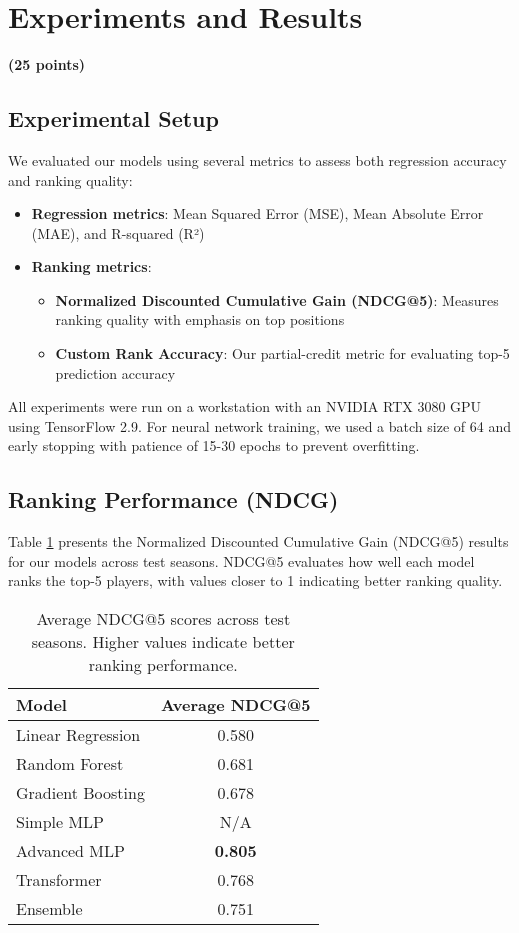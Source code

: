 \documentclass[10pt,twocolumn,letterpaper]{article}
\begin{document}
\section{Experiments and Results}
\textbf{(25 points)}

\subsection{Experimental Setup}

We evaluated our models using several metrics to assess both regression accuracy and ranking quality:

\begin{itemize}
    \item \textbf{Regression metrics}: Mean Squared Error (MSE), Mean Absolute Error (MAE), and R-squared (R²)
    \item \textbf{Ranking metrics}: 
    \begin{itemize}
        \item \textbf{Normalized Discounted Cumulative Gain (NDCG@5)}: Measures ranking quality with emphasis on top positions
        \item \textbf{Custom Rank Accuracy}: Our partial-credit metric for evaluating top-5 prediction accuracy
    \end{itemize}
\end{itemize}

All experiments were run on a workstation with an NVIDIA RTX 3080 GPU using TensorFlow 2.9. For neural network training, we used a batch size of 64 and early stopping with patience of 15-30 epochs to prevent overfitting.

\subsection{Ranking Performance (NDCG)}

Table \ref{tab:ndcg_results} presents the Normalized Discounted Cumulative Gain (NDCG@5) results for our models across test seasons. NDCG@5 evaluates how well each model ranks the top-5 players, with values closer to 1 indicating better ranking quality.

\begin{table}
\begin{center}
\begin{tabular}{|l|c|}
\hline
Model & Average NDCG@5 \\
\hline\hline
Linear Regression & 0.580 \\
Random Forest & 0.681 \\
Gradient Boosting & 0.678 \\
Simple MLP & N/A \\
Advanced MLP & \textbf{0.805} \\
Transformer & 0.768 \\
Ensemble & 0.751 \\
\hline
\end{tabular}
\end{center}
\caption{Average NDCG@5 scores across test seasons. Higher values indicate better ranking performance.}
\label{tab:ndcg_results}
\end{table}
\end{document}
